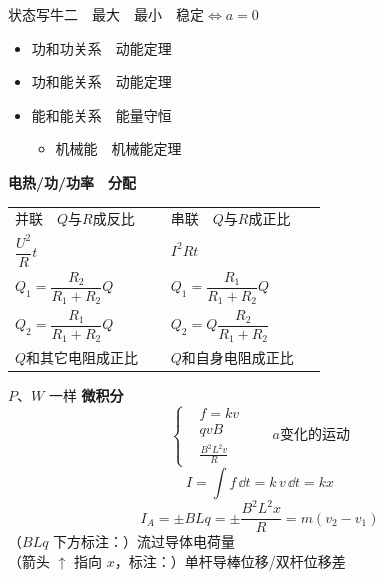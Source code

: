 状态写牛二　最大　最小　稳定$\Leftrightarrow a=0$
\begin{itemize}
  \item 功和功关系　动能定理
  \item 功和能关系　动能定理
  \item 能和能关系　能量守恒
  \begin{itemize}
    \item 机械能　机械能定理
  \end{itemize}
\end{itemize}
\textbf{电热/功/功率　分配}
\begin{center}
\begin{tabular}{p{0.44\linewidth}p{0.44\linewidth}}
并联　$Q$与$R$成反比 & 串联　$Q$与$R$成正比\\[2pt]
$\dfrac{U^2}{R}t$ & $I^2Rt$\\[6pt]
$Q_1=\dfrac{R_2}{R_1+R_2}Q$ & $Q_1=\dfrac{R_1}{R_1+R_2}Q$\\[8pt]
$Q_2=\dfrac{R_1}{R_1+R_2}Q$ & $Q_2=Q\dfrac{R_2}{R_1+R_2}$\\[8pt]
$Q$和其它电阻成正比 & $Q$和自身电阻成正比
\end{tabular}
\end{center}
$P$、$W$ 一样
\textbf{微积分}
\[
\left\{\begin{aligned}
&f=kv\\
&qvB\\
&\frac{B^2L^2v}{R}
\end{aligned}\right.
\qquad a\text{变化的运动}
\]
\[
I=\int f\,\dd t=k\,v\,\dd t=kx
\]
\[
I_A=\pm BLq=\pm\frac{B^2L^2x}{R}=m(v_2-v_1)
\]
（$BLq$ 下方标注：）流过导体电荷量\\
（箭头 $\uparrow$ 指向 $x$，标注：）单杆导棒位移/双杆位移差
